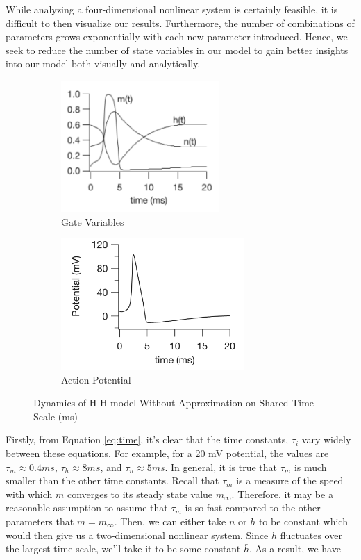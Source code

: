 \documentclass{article}
\begin{document}
While analyzing a four-dimensional nonlinear system is certainly feasible, it is difficult to then visualize our results. Furthermore, the number of combinations of parameters grows exponentially with each new parameter introduced. Hence, we seek to reduce the number of state variables in our model to gain better insights into our model both visually and analytically. 

\begin{figure}[h]
\centering
\begin{subfigure}{.5\textwidth}
	\centering
	\includegraphics[height=5cm]{keener1.png}
	\caption{Gate Variables}
\end{subfigure}%
\begin{subfigure}{.5\textwidth}
	\centering
	\includegraphics[height=5cm]{keener2.png}
	\caption{Action Potential}
\end{subfigure}
	\caption{Dynamics of H-H model Without Approximation on Shared Time-Scale (ms)}
	\label{fig:keen}
\end{figure}


Firstly, from Equation \ref{eq:time}, it's clear that the time constants, $\tau_i$ vary widely between these equations. For example, for a 20 mV potential, the values are $\tau_m \approx 0.4 ms$, $\tau_h \approx 8 ms$, and $\tau_n \approx 5 ms$. In general, it is true that $\tau_m$ is much smaller than the other time constants. Recall that $\tau_m$ is a measure of the speed with which $m$ converges to its steady state value $m_\infty$. Therefore, it may be a reasonable assumption to assume that $\tau_m$ is so fast compared to the other parameters that $m = m_\infty$. Then, we can either take $n$ or $h$ to be constant which would then give us a two-dimensional nonlinear system. Since $h$ fluctuates over the largest time-scale, we'll take it to be some constant $\bar{h}$. As a result, we have 
\end{document}
